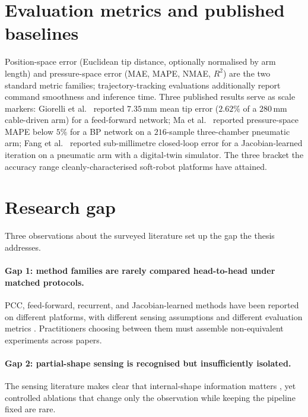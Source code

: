 \section{Evaluation metrics and published baselines}
\label{sec:bg_metrics}

Position-space error (Euclidean tip distance, optionally normalised by arm length) and pressure-space error (MAE, MAPE, NMAE, $R^{2}$) are the two standard metric families; trajectory-tracking evaluations additionally report command smoothness and inference time. Three published results serve as scale markers: Giorelli et al.\ \cite{giorelli2015nn} reported $7.35$\,mm mean tip error ($2.62\%$ of a $280$\,mm cable-driven arm) for a feed-forward network; Ma et al.\ \cite{ma2022bp} reported pressure-space MAPE below $5\%$ for a BP network on a $216$-sample three-chamber pneumatic arm; Fang et al.\ \cite{fang2022jacobian} reported sub-millimetre closed-loop error for a Jacobian-learned iteration on a pneumatic arm with a digital-twin simulator. The three bracket the accuracy range cleanly-characterised soft-robot platforms have attained.

\section{Research gap}
\label{sec:bg_gap}

Three observations about the surveyed literature set up the gap the thesis addresses.

\paragraph{Gap 1: method families are rarely compared head-to-head under matched protocols.}
PCC, feed-forward, recurrent, and Jacobian-learned methods have been reported on different platforms, with different sensing assumptions and different evaluation metrics \cite{webster2010review, thuruthel2018survey, kim2021mlsoft, wang2021mlsurvey, giorelli2015nn, ma2022bp, thuruthel2019modelbased, tariverdi2021rnn, fang2022jacobian}. Practitioners choosing between them must assemble non-equivalent experiments across papers.

\paragraph{Gap 2: partial-shape sensing is recognised but insufficiently isolated.}
The sensing literature makes clear that internal-shape information matters \cite{sincak2024sensing, wang2024proprioception}, yet controlled ablations that change only the observation while keeping the pipeline fixed are rare.

